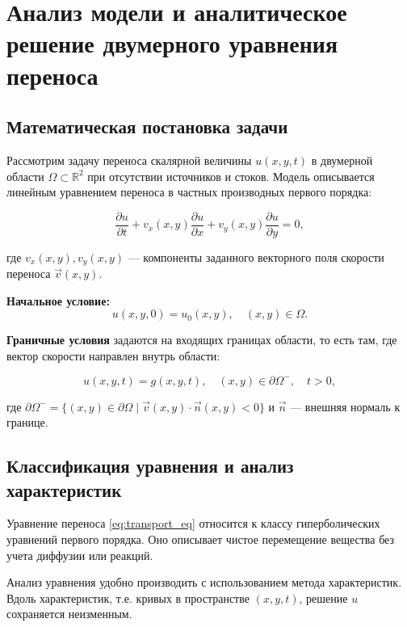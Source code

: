 \chapter{Анализ модели и аналитическое решение двумерного уравнения переноса}

\section{Математическая постановка задачи}

Рассмотрим задачу переноса скалярной величины $u(x, y, t)$ в двумерной области $\Omega \subset \mathbb{R}^2$ при отсутствии источников и стоков. Модель описывается линейным уравнением переноса  в частных производных первого порядка:

\begin{equation}
	\frac{\partial u}{\partial t} + v_x(x, y) \frac{\partial u}{\partial x} + v_y(x, y) \frac{\partial u}{\partial y} = 0,
	\label{eq:transport_eq}
\end{equation}

где $v_x(x, y), v_y(x, y)$ — компоненты заданного векторного поля скорости переноса $\vec{v}(x, y)$.

\textbf{Начальное условие:}
\begin{equation}
	u(x, y, 0) = u_0(x, y), \quad (x, y) \in \Omega.
	\label{eq:initial_condition}
\end{equation}

\textbf{Граничные условия} задаются на входящих границах области, то есть там, где вектор скорости направлен внутрь области:

\begin{equation}
	u(x, y, t) = g(x, y, t), \quad (x, y) \in \partial \Omega^{-}, \quad t > 0,
\end{equation}

где $\partial \Omega^{-} = \{ (x, y) \in \partial \Omega \mid \vec{v}(x, y) \cdot \vec{n}(x, y) < 0 \}$ и $\vec{n}$ — внешняя нормаль к границе.

\section{Классификация уравнения и анализ характеристик}

Уравнение переноса \eqref{eq:transport_eq} относится к классу гиперболических уравнений первого порядка. Оно описывает чистое перемещение вещества без учета диффузии или реакций.

Анализ уравнения удобно производить с использованием метода характеристик. Вдоль характеристик, т.е. кривых в пространстве $(x, y, t)$, решение $u$ сохраняется неизменным.

